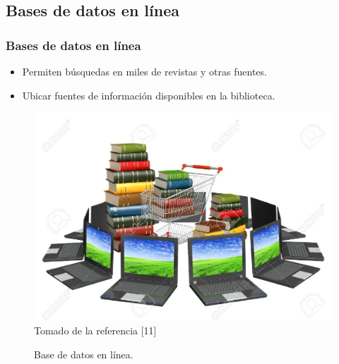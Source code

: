 \documentclass{beamer}
\begin{document}
    \subsection{Bases de datos en l\'inea}
        \begin{frame}\frametitle{Bases de datos en l\'inea}
            \begin{itemize}
                \item Permiten b\'usquedas en miles de revistas y otras fuentes.  
                \item Ubicar fuentes de informaci\'on disponibles en la biblioteca.
            \end{itemize} 
            \begin{figure}
                \includegraphics[scale=0.45]{figures/onlineDB}
                \newline
                {\tiny Tomado de la referencia [11] }
                \caption{ Base de datos en l\'inea. }
            \end{figure} 
        \end{frame}
\end{document}

